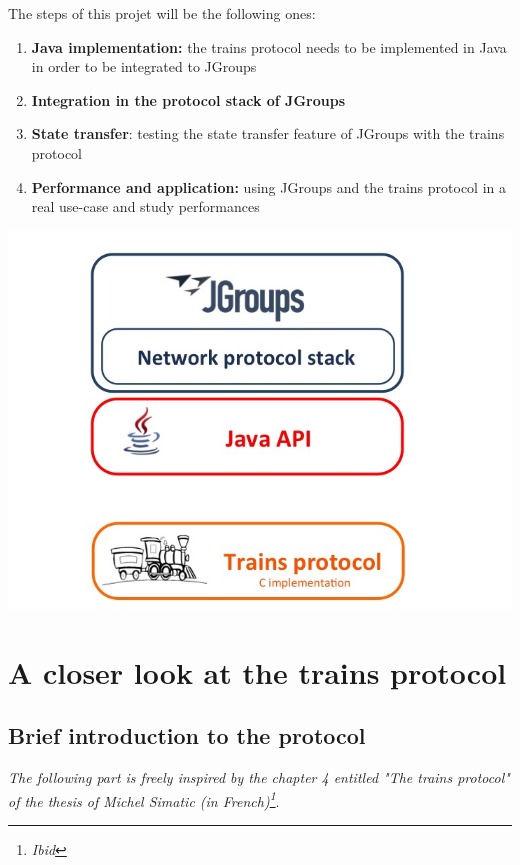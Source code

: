 \documentclass[a4paper,10pt]{report}
\begin{document}
The steps of this projet will be the following ones: 

\begin{enumerate}
  \item \textbf{Java implementation:} the trains protocol needs to be implemented in Java in order to be integrated to JGroups
  \item \textbf{Integration in the protocol stack of JGroups}
  \item \textbf{State transfer}: testing the state transfer feature of JGroups with the trains protocol
  \item \textbf{Performance and application:} using JGroups and the trains protocol in a real use-case and study performances
\end{enumerate}

\begin{center}
\includegraphics[scale=0.4]{img/stack.jpg}
\end{center}

\section{A closer look at the trains protocol}

\subsection{Brief introduction to the protocol}

\textit{The following part is freely inspired by the chapter 4 entitled "The trains protocol" of the thesis of Michel Simatic (in French)\footnote{\textit{Ibid}}}.\\
\end{document}
